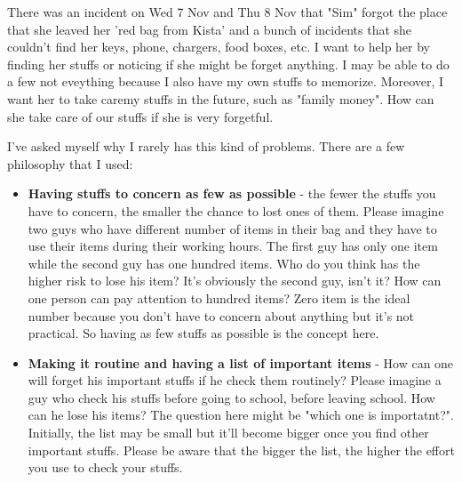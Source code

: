There was an incident on Wed 7 Nov and Thu 8 Nov that "Sim" forgot the place that she leaved her 'red bag from Kista' and a bunch of incidents that she couldn't find her keys, phone, chargers, food boxes, etc. I want to help her by finding her stuffs or noticing if she might be forget anything. I may be able to do a few not eveything because I also have my own stuffs to memorize. Moreover, I want her to take caremy stuffs in the future, such as "family money". How can she take care of our stuffs if she is very forgetful.

I've asked myself why I rarely has this kind of problems. There are a few philosophy that I used:
\begin{itemize}
\item {\bf Having stuffs to concern as few as possible} - the fewer the stuffs you have to concern, the smaller the chance to lost ones of them. Please imagine two guys who have different number of items in their bag and they have to use their items during their working hours. The first guy has only one item while the second guy has one hundred items. Who do you think has the higher risk to lose his item? It's obviously the second guy, isn't it? How can one person can pay attention to hundred items? Zero item is the ideal number because you don't have to concern about anything but it's not practical. So having as few stuffs as possible is the concept here. 
\item {\bf Making it routine and having a list of important items} - How can one will forget his important stuffs if he check them routinely? Please imagine a guy who check his stuffs before going to school, before leaving school. How can he lose his items? The question here might be "which one is importatnt?". Initially, the list may be small but it'll become bigger once you find other important stuffs. Please be aware that the bigger the list, the higher the effort you use to check your stuffs.

\end{itemize}
